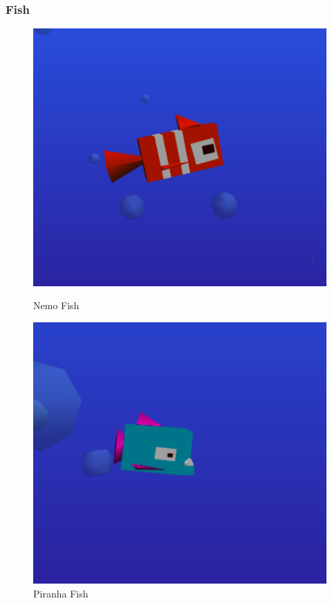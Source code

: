 \documentclass[a4paper,10pt]{article}
\begin{document}
\subsubsection{Fish}


\begin{figure}[H]
    \centering
    \begin{minipage}{0.45\textwidth}
        \centering
        \includegraphics[width=1\textwidth]{Screenshot_20190226_200844.png} %
        \caption{Nemo Fish}
    \end{minipage}\hfill
    \begin{minipage}{0.45\textwidth}
        \centering
        \includegraphics[width=1\textwidth]{Screenshot_20190226_200918.png} %
        \caption{Piranha Fish}
    \end{minipage}
\end{figure}
\end{document}

